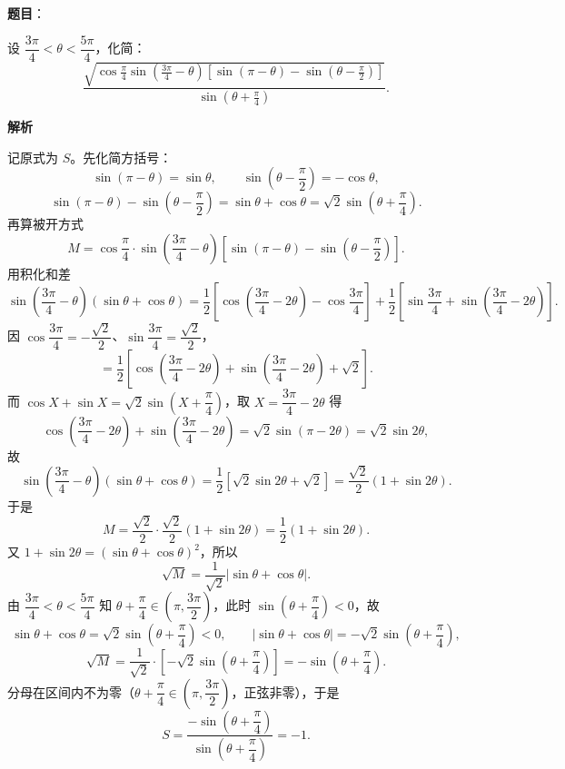 \begin{answer}

\textbf{题目}：

设 $\dfrac{3\pi}{4}<\theta<\dfrac{5\pi}{4}$，化简：
\nopagebreak[4]
\[
\frac{\sqrt{\cos\frac{\pi}{4}\sin\left(\frac{3\pi}{4}-\theta\right)\left[\sin(\pi-\theta)-\sin\left(\theta-\frac{\pi}{2}\right)\right]}}{\sin\left(\theta+\frac{\pi}{4}\right)}.
\]

\textbf{解析}

记原式为 $S$。先化简方括号：
\nopagebreak[4]
\[
\sin(\pi-\theta)=\sin\theta,\qquad \sin\left(\theta-\frac{\pi}{2}\right)=-\cos\theta,
\]
\nopagebreak[4]
\[
\sin(\pi-\theta)-\sin\left(\theta-\frac{\pi}{2}\right)=\sin\theta+\cos\theta=\sqrt2\sin\left(\theta+\frac{\pi}{4}\right).
\]
再算被开方式
\nopagebreak[4]
\[
M=\cos\frac{\pi}{4}\cdot\sin\left(\frac{3\pi}{4}-\theta\right)\left[\sin(\pi-\theta)-\sin\left(\theta-\frac{\pi}{2}\right)\right].
\]
用积化和差
\nopagebreak[4]
\[
\sin\left(\frac{3\pi}{4}-\theta\right)(\sin\theta+\cos\theta)
=\frac12\left[\cos\left(\frac{3\pi}{4}-2\theta\right)-\cos\frac{3\pi}{4}\right]
+\frac12\left[\sin\frac{3\pi}{4}+\sin\left(\frac{3\pi}{4}-2\theta\right)\right].
\]
因 $\cos\dfrac{3\pi}{4}=-\dfrac{\sqrt2}{2}$、$\sin\dfrac{3\pi}{4}=\dfrac{\sqrt2}{2}$，
\nopagebreak[4]
\[
=\frac12\left[\cos\left(\frac{3\pi}{4}-2\theta\right)+\sin\left(\frac{3\pi}{4}-2\theta\right)+\sqrt2\right].
\]
而 $\cos X+\sin X=\sqrt2\sin\left(X+\dfrac{\pi}{4}\right)$，取 $X=\dfrac{3\pi}{4}-2\theta$ 得
\nopagebreak[4]
\[
\cos\left(\frac{3\pi}{4}-2\theta\right)+\sin\left(\frac{3\pi}{4}-2\theta\right)=\sqrt2\sin(\pi-2\theta)=\sqrt2\sin2\theta,
\]
故
\nopagebreak[4]
\[
\sin\left(\frac{3\pi}{4}-\theta\right)(\sin\theta+\cos\theta)
=\frac12\left[\sqrt2\sin2\theta+\sqrt2\right]=\frac{\sqrt2}{2}(1+\sin2\theta).
\]
于是
\nopagebreak[4]
\[
M=\frac{\sqrt2}{2}\cdot\frac{\sqrt2}{2}(1+\sin2\theta)=\frac12(1+\sin2\theta).
\]
又 $1+\sin2\theta=(\sin\theta+\cos\theta)^2$，所以
\nopagebreak[4]
\[
\sqrt M=\frac{1}{\sqrt2}\left|\sin\theta+\cos\theta\right|.
\]
由 $\dfrac{3\pi}{4}<\theta<\dfrac{5\pi}{4}$ 知 $\theta+\dfrac{\pi}{4}\in\left(\pi,\dfrac{3\pi}{2}\right)$，此时 $\sin\left(\theta+\dfrac{\pi}{4}\right)<0$，故
\nopagebreak[4]
\[
\sin\theta+\cos\theta=\sqrt2\sin\left(\theta+\frac{\pi}{4}\right)<0,
\qquad
\left|\sin\theta+\cos\theta\right|=-\sqrt2\sin\left(\theta+\frac{\pi}{4}\right),
\]
\nopagebreak[4]
\[
\sqrt M=\frac{1}{\sqrt2}\cdot\left[-\sqrt2\sin\left(\theta+\frac{\pi}{4}\right)\right]=-\sin\left(\theta+\frac{\pi}{4}\right).
\]
分母在区间内不为零（$\theta+\dfrac{\pi}{4}\in\left(\pi,\dfrac{3\pi}{2}\right)$，正弦非零），于是
\nopagebreak[4]
\[
S=\frac{-\sin\left(\theta+\dfrac{\pi}{4}\right)}{\sin\left(\theta+\dfrac{\pi}{4}\right)}=-1.
\]


\end{answer}
